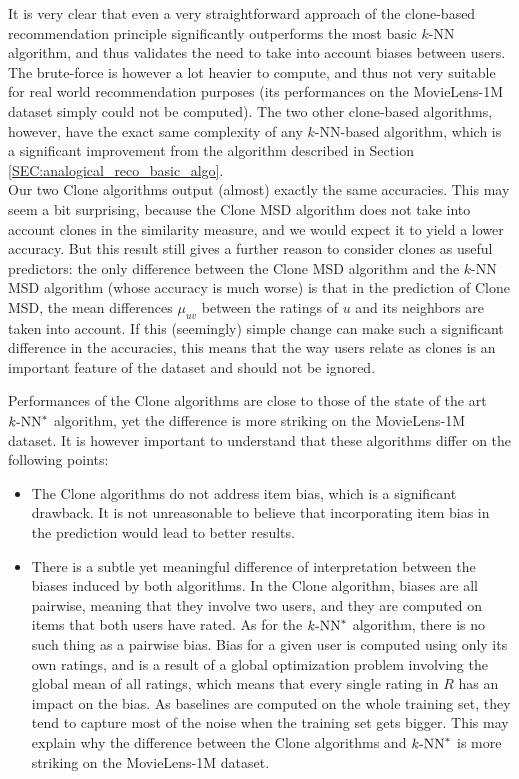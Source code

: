 It is very clear that even a very straightforward approach of the clone-based
recommendation principle significantly outperforms the most basic $k$-NN
algorithm, and thus validates the need to take into account biases between
users. The brute-force is however a lot heavier to compute, and thus not very
suitable for real world recommendation purposes (its performances on the
MovieLens-1M dataset simply could not be computed). The two other clone-based
algorithms, however, have the exact same complexity of any $k$-NN-based
algorithm, which is a significant improvement from the algorithm described in
Section \ref{SEC:analogical_reco_basic_algo}.\\

Our two Clone algorithms output (almost) exactly the same
accuracies. This may seem a bit surprising, because the Clone MSD algorithm
does not take into account clones in the similarity measure, and we would
expect it to yield a lower accuracy. But this result still gives a further
reason to consider clones as useful predictors: the only difference between the
Clone MSD algorithm and the $k$-NN MSD algorithm (whose accuracy is much worse)
is that in the prediction of Clone MSD, the mean differences $\mu_{uv}$ between
the ratings of $u$ and its neighbors are taken into account. If this
(seemingly) simple change can make such a significant difference in the
accuracies, this means that the way users relate as clones is an important
feature of the dataset and should not be ignored.

Performances of the Clone algorithms are close to those of the state of the
art $k\text{-NN}^*$ algorithm, yet the difference is more striking on the MovieLens-1M
dataset. It is however important to understand that these algorithms differ on
the following points:
\begin{itemize}
\item The Clone algorithms do not address item bias, which is a significant
  drawback. It is not unreasonable to believe that incorporating item bias
  in the prediction would lead to better results.
\item There is a subtle yet meaningful difference of interpretation between the
  biases induced by both algorithms. In the Clone algorithm, biases are all
  pairwise, meaning that they involve two users, and they are computed on items
  that both users have rated. As for the $k\text{-NN}^*$ algorithm, there is no such
  thing as a pairwise bias. Bias for a given user is computed using only its
  own ratings, and is a result of a global optimization problem involving the
  global mean of all ratings, which means that every single rating in $R$ has
  an impact on the bias. As baselines are computed on the whole training set,
    they tend to capture most of the noise when the training set gets bigger.
    This may explain why the difference between the Clone algorithms and
    $k\text{-NN}^*$ is more striking on the MovieLens-1M dataset.
\end{itemize}

